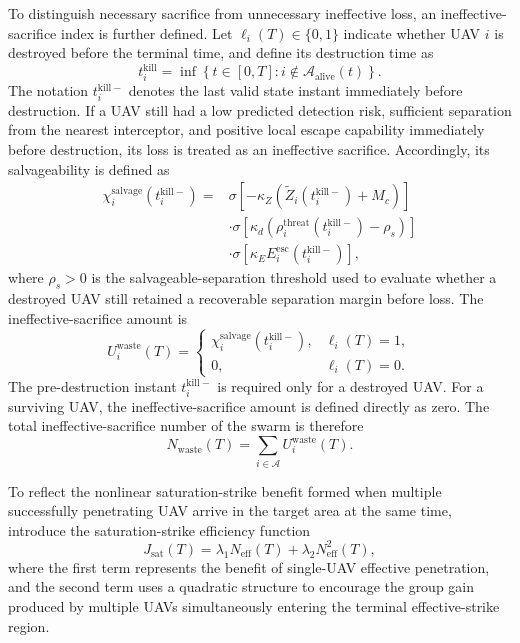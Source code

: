 \documentclass{cja}
\begin{document}
To distinguish necessary sacrifice from unnecessary ineffective loss, an ineffective-sacrifice index is further defined. Let $\ell_i(T)\in\{0,1\}$ indicate whether UAV $i$ is destroyed before the terminal time, and define its destruction time as
\begin{equation}
t_i^{\mathrm{kill}}
=
\inf\left\{
t\in[0,T]:
i\notin\mathcal A_{\mathrm{alive}}(t)
\right\}.
\end{equation}
The notation $t_i^{\mathrm{kill}-}$ denotes the last valid state instant immediately before destruction. If a UAV still had a low predicted detection risk, sufficient separation from the nearest interceptor, and positive local escape capability immediately before destruction, its loss is treated as an ineffective sacrifice. Accordingly, its salvageability is defined as
\begin{equation}
\begin{aligned}
\chi_i^{\mathrm{salvage}}\!\left(t_i^{\mathrm{kill}-}\right)
={}&
\sigma\!\left[-\kappa_Z\left(\widetilde Z_i\!\left(t_i^{\mathrm{kill}-}\right)+M_c\right)\right]\\
&\cdot
\sigma\!\left[\kappa_d\left(\rho_i^{\mathrm{threat}}\!\left(t_i^{\mathrm{kill}-}\right)-\rho_s\right)\right]\\
&\cdot
\sigma\!\left[\kappa_E E_i^{\mathrm{esc}}\!\left(t_i^{\mathrm{kill}-}\right)\right],
\end{aligned}
\end{equation}
where $\rho_s>0$ is the salvageable-separation threshold used to evaluate whether a destroyed UAV still retained a recoverable separation margin before loss.
The ineffective-sacrifice amount is
\begin{equation}
U_i^{\mathrm{waste}}(T)
=
\begin{cases}
\chi_i^{\mathrm{salvage}}\!\left(t_i^{\mathrm{kill}-}\right),
&
\ell_i(T)=1,\\[2mm]
0,
&
\ell_i(T)=0.
\end{cases}
\end{equation}
The pre-destruction instant $t_i^{\mathrm{kill}-}$ is required only for a destroyed UAV. For a surviving UAV, the ineffective-sacrifice amount is defined directly as zero.
The total ineffective-sacrifice number of the swarm is therefore
\begin{equation}
N_{\mathrm{waste}}(T)
=
\sum_{i\in\mathcal{A}} U_i^{\mathrm{waste}}(T).
\end{equation}

To reflect the nonlinear saturation-strike benefit formed when multiple successfully penetrating UAV arrive in the target area at the same time, introduce the saturation-strike efficiency function
\begin{equation}
J_{\mathrm{sat}}(T)
=
\lambda_1 N_{\mathrm{eff}}(T)
+
\lambda_2 N_{\mathrm{eff}}^2(T),
\end{equation}
where the first term represents the benefit of single-UAV effective penetration, and the second term uses a quadratic structure to encourage the group gain produced by multiple UAVs simultaneously entering the terminal effective-strike region.
\end{document}
